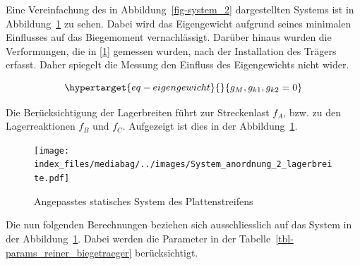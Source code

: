 \documentclass[
  12pt,
  letterpaper,
  egregdoesnotlikesansseriftitles]{scrreprt}
\begin{document}
Eine Vereinfachung des in Abbildung~\ref{fig-system_2} dargestellten
Systems ist in Abbildung~\ref{fig-system_2_lager} zu sehen. Dabei wird
das Eigengewicht aufgrund seines minimalen Einflusses auf das
Biegemoment vernachlässigt. Darüber hinaus wurden die Verformungen, die
in {[}\protect\hyperlink{ref-Jaeger2006}{1}{]} gemessen wurden, nach der
Installation des Trägers erfasst. Daher spiegelt die Messung den
Einfluss des Eigengewichts nicht wider.

\begin{equation}\protect\hypertarget{eq-eigengewicht}{}{
g_M, g_{k1}, g_{k2} = 0
}\label{eq-eigengewicht}\end{equation}

Die Berücksichtigung der Lagerbreiten führt zur Streckenlast \(f_A\),
bzw. zu den Lagerreaktionen \(f_B\) und \(f_C\). Aufgezeigt ist dies in
der Abbildung~\ref{fig-system_2_lager}.

\begin{figure}[H]

{\centering \texttt{[image: index\_files/mediabag/../images/System\_anordnung\_2\_lagerbreite.pdf]}

}

\caption{\label{fig-system_2_lager}Angepasstes statisches System des
Plattenstreifens}

\end{figure}

Die nun folgenden Berechnungen beziehen sich ausschliesslich auf das
System in der Abbildung~\ref{fig-system_2_lager}. Dabei werden die
Parameter in der Tabelle~\ref{tbl-params_reiner_biegetraeger}
berücksichtigt.
\end{document}
